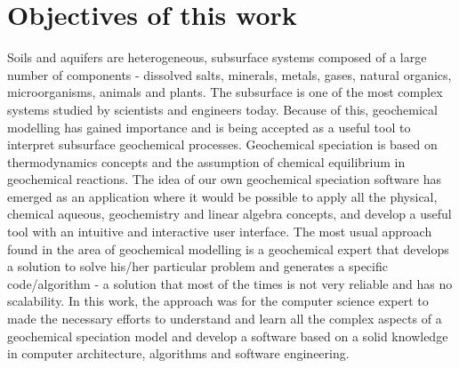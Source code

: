 \documentclass[ppgc,mestrado,english]{iiufrgs}
\begin{document}
\section{Objectives of this work}
Soils and aquifers are heterogeneous, subsurface systems composed of a large number of components - dissolved salts, minerals, metals, gases, natural organics, microorganisms, animals and plants. The subsurface is one of the most complex systems studied by scientists and engineers today. Because of this, geochemical modelling has gained importance and is being accepted as a useful tool to interpret subsurface geochemical processes. Geochemical speciation is based on thermodynamics concepts and the assumption of chemical equilibrium in geochemical reactions.
The idea of our own geochemical speciation software has emerged as an application where it would be possible to apply all the physical, chemical aqueous, geochemistry and linear algebra concepts, and develop a useful tool with an intuitive and interactive user interface. The most usual approach found in the area of geochemical modelling is a geochemical expert that develops a solution to solve his/her particular problem and generates a specific code/algorithm - a solution that most of the times is not very reliable and has no scalability. In this work, the approach was for the computer science expert to made the necessary efforts to understand and learn all the complex aspects of a geochemical speciation model and develop a software based on a solid knowledge in computer architecture, algorithms and software engineering. 
\end{document}
